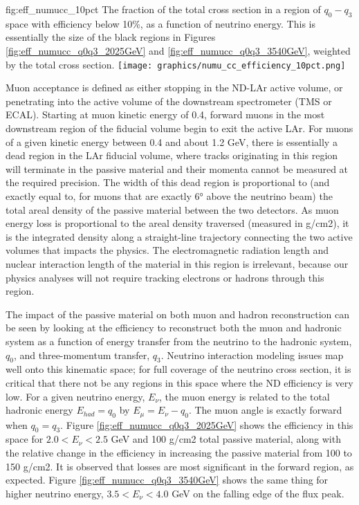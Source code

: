 \begin{dunefigure}{fig:eff_numucc_10pct}
{The fraction of the total cross section in a region of $q_0-q_3$ space with efficiency below 10\%, as a function of neutrino energy. This is essentially the size of the black regions in Figures \ref{fig:eff_numucc_q0q3_2025GeV} and \ref{fig:eff_numucc_q0q3_3540GeV}, weighted by the total cross section.}
\texttt{[image: graphics/numu\_cc\_efficiency\_10pct.png]}
\end{dunefigure}


Muon acceptance is defined as either stopping in the ND-LAr active volume, or penetrating into the active volume of the downstream spectrometer (TMS or ECAL). Starting at muon kinetic energy of 0.4, forward muons in the most downstream region of the fiducial volume begin to exit the active LAr. For muons of a given kinetic energy between 0.4 and about 1.2 GeV, there is essentially a dead region in the LAr fiducial volume, where tracks originating in this region will terminate in the passive material and their momenta cannot be measured at the required precision. The width of this dead region is proportional to (and exactly equal to, for muons that are exactly 6° above the neutrino beam) the total areal density of the passive material between the two detectors. As muon energy loss is proportional to the areal density traversed (measured in g/cm2), it is the integrated density along a straight-line trajectory connecting the two active volumes that impacts the physics. The electromagnetic radiation length and nuclear interaction length of the material in this region is irrelevant, because our physics analyses will not require tracking electrons or hadrons through this region.

The impact of the passive material on both muon and hadron reconstruction can be seen by looking at the efficiency to reconstruct both the muon and hadronic system as a function of energy transfer from the neutrino to the hadronic system, $q_0$, and three-momentum transfer, $q_3$. Neutrino interaction modeling issues map well onto this kinematic space; for full coverage of the neutrino cross section, it is critical that there not be any regions in this space where the ND efficiency is very low. For a given neutrino energy, $E_\nu$, the muon energy is related to the total hadronic energy $E_{had} = q_0$ by $E_\mu = E_\nu - q_0$. The muon angle is exactly forward when $q_0 = q_3$. Figure \ref{fig:eff_numucc_q0q3_2025GeV} shows the efficiency in this space for $2.0 < E_\nu < 2.5$ GeV and 100 g/cm2 total passive material, along with the relative change in the efficiency in increasing the passive material from 100 to 150 g/cm2. It is observed that losses are most significant in the forward region, as expected. Figure \ref{fig:eff_numucc_q0q3_3540GeV} shows the same thing for higher neutrino energy, $3.5 < E_\nu < 4.0$ GeV on the falling edge of the flux peak.


